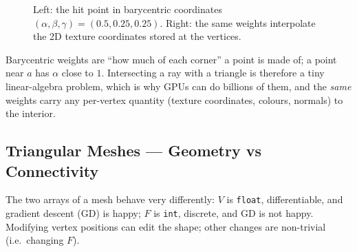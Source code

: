 \documentclass[11pt,a4paper]{article}
\newcommand{\vo}{\bm{o}}
\newcommand{\vd}{\bm{d}}
\theoremstyle{definition}
\theoremstyle{plain}
\theoremstyle{remark}
\begin{document}
\begin{figure}[ht]
\centering
{}
\caption{Left: the hit point in barycentric coordinates $(\alpha,\beta,\gamma)=(0.5,0.25,0.25)$. Right: the same weights interpolate the 2D texture coordinates stored at the vertices.}
\end{figure}

\begin{intuition}
Barycentric weights are ``how much of each corner'' a point is made of; a point near $a$ has $\alpha$ close to $1$. Intersecting a ray with a triangle is therefore a tiny linear-algebra problem, which is why GPUs can do billions of them, and the \emph{same} weights carry any per-vertex quantity (texture coordinates, colours, normals) to the interior.
\end{intuition}

\subsection{Triangular Meshes --- Geometry vs Connectivity }
The two arrays of a mesh behave very differently:
$V$ is \texttt{float}, differentiable, and gradient descent (GD) is happy; $F$ is \texttt{int}, discrete, and GD is not happy. Modifying vertex positions can edit the shape; other changes are non-trivial (i.e.\ changing $F$).
\end{document}
